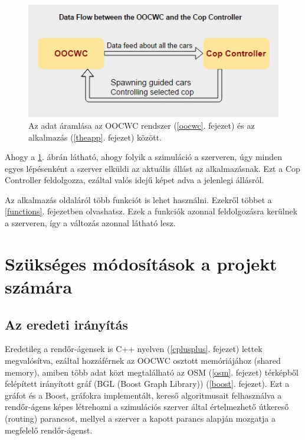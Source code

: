 \documentclass[a4paper,12pt]{report}
\begin{document}
\begin{figure}[ht]
\centerline{
\includegraphics[width=4.5in]{img/dataflow}}
\caption{Az adat áramlása az OOCWC rendszer (\ref{oocwc}. fejezet) és az alkalmazás (\ref{theapp}. fejezet) között.}
\label{dataflowpicture}
\end{figure}

Ahogy a \ref{dataflowpicture}. ábrán látható, ahogy folyik a szimuláció a szerveren, úgy minden egyes lépésenként a szerver elküldi az aktuális állást az alkalmazásnak. Ezt a Cop Controller feldolgozza, ezáltal valós idejű képet adva a jelenlegi állásról.

\vspace{2mm}
Az alkalmazás oldaláról több funkciót is lehet használni. Ezekről többet a \ref{functions}. fejezetben olvashatsz. Ezek a funkciók azonnal feldolgozásra kerülnek a szerveren, így a változás azonnal látható lesz.

\section{Szükséges módosítások a projekt számára}
\label{changes}

\subsection{Az eredeti irányítás}
\label{originalrouting}

Eredetileg a rendőr-ágensek is C++ nyelven (\ref{cplusplus}. fejezet) lettek megvalósítva, ezáltal hozzáférnek az OOCWC osztott memóriájához (shared memory), amiben több adat közt megtalálható az OSM \citep{osm} (\ref{osm}. fejezet) térképből felépített irányított gráf (BGL (Boost Graph Library)) (\ref{boost}. fejezet). Ezt a gráfot és a Boost, gráfokra implementált, kereső algoritmusait felhasználva a rendőr-ágens képes létrehozni a szimulációs szerver által értelmezhető útkereső (routing) parancsot, mellyel a szerver a kapott parancs alapján mozgatja a megfelelő rendőr-ágenst. 
\end{document}
